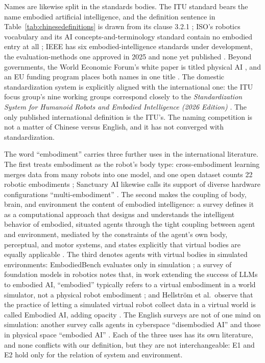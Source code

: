 \documentclass[10pt]{article}
\begin{document}
Names are likewise split in the standards bodies. The ITU standard bears the name embodied artificial intelligence, and the definition sentence in Table~\ref{tab:chinesedefinitions} is drawn from its clause 3.2.1 \cite{itu2025}; ISO's robotics vocabulary and its AI concepts-and-terminology standard contain no embodied entry at all \cite{iso2021,isoiec2022}; IEEE has six embodied-intelligence standards under development, the evaluation-methods one approved in 2025 and none yet published \cite{ieee2025}. Beyond governments, the World Economic Forum's white paper is titled physical AI \cite{wef2025}, and an EU funding program places both names in one title \cite{eucordis2025}. The domestic standardization system is explicitly aligned with the international one: the ITU focus group's nine working groups correspond closely to the \textit{Standardization System for Humanoid Robots and Embodied Intelligence (2026 Edition)} \cite{caict2026,std2026}. The only published international definition is the ITU's. The naming competition is not a matter of Chinese versus English, and it has not converged with standardization.

The word ``embodiment'' carries three further uses in the international literature. The first treats embodiment as the robot's body type: cross-embodiment learning merges data from many robots into one model, and one open dataset counts 22 robotic embodiments \cite{oneill2024,black2024,kim2024,nvidiagroot2025}; Sanctuary AI likewise calls its support of diverse hardware configurations ``multi-embodiment'' \cite{sanctuary}. The second makes the coupling of body, brain, and environment the content of embodied intelligence: a survey defines it as a computational approach that designs and understands the intelligent behavior of embodied, situated agents through the tight coupling between agent and environment, mediated by the constraints of the agent's own body, perceptual, and motor systems, and states explicitly that virtual bodies are equally applicable \cite{liu2025csur}. The third denotes agents with virtual bodies in simulated environments: EmbodiedBench evaluates only in simulation \cite{yang2025embodiedbench}; a survey of foundation models in robotics notes that, in work extending the success of LLMs to embodied AI, ``embodied'' typically refers to a virtual embodiment in a world simulator, not a physical robot embodiment \cite{firoozi2025}; and Hellstr\"om et al.\ observe that the practice of letting a simulated virtual robot collect data in a virtual world is called Embodied AI, adding opacity \cite{hellstrom2024}. The English surveys are not of one mind on simulation: another survey calls agents in cyberspace ``disembodied AI'' and those in physical space ``embodied AI'' \cite{liu2024survey}. Each of the three uses has its own literature, and none conflicts with our definition, but they are not interchangeable: E1 and E2 hold only for the relation of system and environment.
\end{document}
